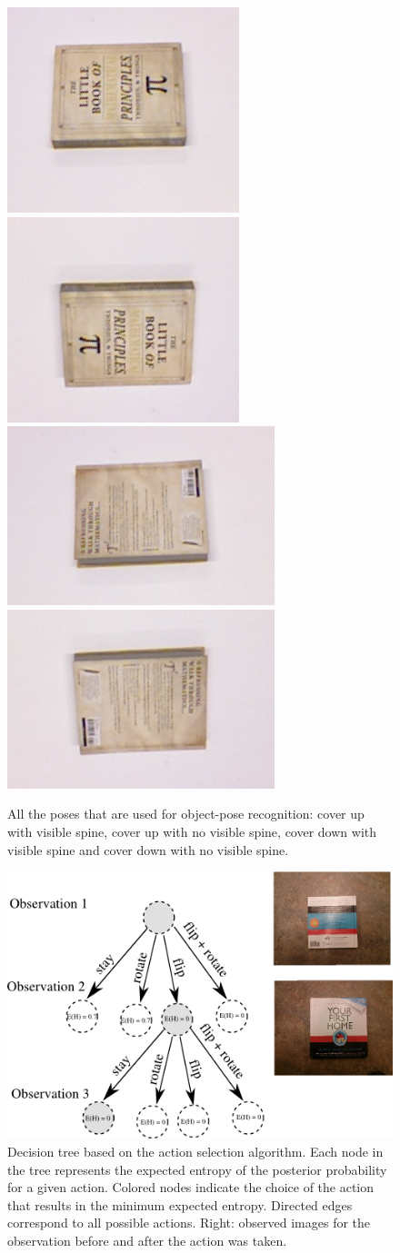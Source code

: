      \begin{figure}
    		\includegraphics[width = 0.2\columnwidth]{pics/math_cover1.jpg}
    		\includegraphics[width = 0.2\columnwidth]{pics/math_cover1_rot.jpg}
    		\includegraphics[width = 0.2\columnwidth]{pics/math_down.jpg}
    		\includegraphics[width = 0.2\columnwidth]{pics/math_down_rot.jpg}
    		\caption{All the poses that are used for object-pose recognition: cover up with visible spine, cover up with no visible spine, cover down with visible spine and cover down with no visible spine.}
	\label{fig:pose_dataset}
    \end{figure}   
        
        
    \begin{figure}
    		\includegraphics[width = 0.8\columnwidth]{pics/tree_small2.png}
    	\caption{Decision tree based on the action selection algorithm. Each node in the tree represents the expected entropy of the posterior probability for a given action. Colored nodes indicate the choice of the action that results in the minimum expected entropy. Directed edges correspond to all possible actions. Right: observed images for the observation before and after the action was taken. }
    	    	\label{fig:tree}
    \end{figure}
    
